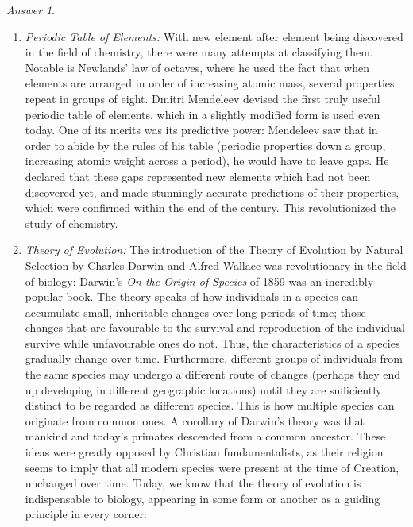 \documentclass[11pt]{article}
\theoremstyle{remark}
\newtheorem*{answer}{Answer}
\begin{document}
\begin{answer}
\begin{enumerate}
            \item \textit{Periodic Table of Elements:} With new element after element
            being discovered in the field of chemistry, there were many attempts at
            classifying them. Notable is Newlands' law of octaves, where he used the
            fact that when elements are arranged in order of increasing atomic mass,
            several properties repeat in groups of eight. Dmitri Mendeleev devised
            the first truly useful periodic table of elements, which in a slightly
            modified form is used even today. One of its merits was its predictive
            power: Mendeleev saw that in order to abide by the rules of his table
            (periodic properties down a group, increasing atomic weight across a
            period), he would have to leave gaps. He declared that these gaps
            represented new elements which had not been discovered yet, and made
            stunningly accurate predictions of their properties, which were confirmed
            within the end of the century. This revolutionized the study of chemistry.

            \item \textit{Theory of Evolution:} The introduction of the Theory of
            Evolution by Natural Selection by Charles Darwin and Alfred Wallace was
            revolutionary in the field of biology: Darwin's \emph{On the Origin of
            Species} of 1859 was an incredibly popular book. The theory speaks of how
            individuals in a species can accumulate small, inheritable changes over
            long periods of time; those changes that are favourable to the survival
            and reproduction of the individual survive while unfavourable ones do
            not. Thus, the characteristics of a species gradually change over time.
            Furthermore, different groups of individuals from the same species may
            undergo a different route of changes (perhaps they end up developing in
            different geographic locations) until they are sufficiently distinct to
            be regarded as different species. This is how multiple species can
            originate from common ones. A corollary of Darwin's theory was that
            mankind and today's primates descended from a common ancestor. These
            ideas were greatly opposed by Christian fundamentalists, as their
            religion seems to imply that all modern species were present at the time
            of Creation, unchanged over time. Today, we know that the theory of
            evolution is indispensable to biology, appearing in some form or another
            as a guiding principle in every corner.


\end{enumerate}
\end{answer}
\end{document}
